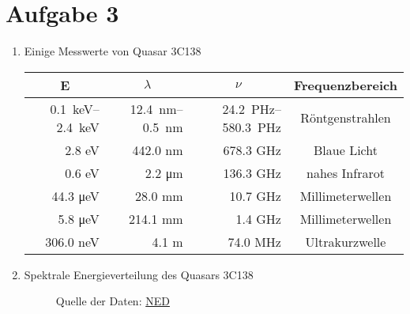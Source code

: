 \documentclass[11pt,a4paper]{scrartcl}
\newcommand{\head}[1]{\multicolumn{1}{c}{#1}}
\begin{document}
\section*{Aufgabe 3}

\begin{enumerate}[label=\textbf{(\alph*)}]

\item
Einige Messwerte von Quasar 3C138

\begin{table}[h!]
\centering
\begin{tabular}{rrrc}
    \toprule
    \head{E} & \head{$\lambda$} & \head{$\nu$} & \head{Frequenzbereich} \\
    \midrule
    \SIrange{0.1}{2.4}{\kilo\electronvolt} & \SIrange{12.4}{0.5}{\nano\metre} &
    \SIrange{24.2}{580.3}{\peta\hertz} & Röntgenstrahlen \\
    2.8 \si{\electronvolt} & 442.0 \si{\nano\metre} & 678.3 \si{\giga\hertz} &
    Blaue Licht \\
    0.6 \si{\electronvolt} & 2.2 \si{\micro\metre} & 136.3 \si{\giga\hertz} &
    nahes Infrarot \\
    44.3 \si{\micro\electronvolt} & 28.0 \si{\milli\metre} & 10.7 \si{\giga\hertz}
    &  Millimeterwellen \\
    5.8 \si{\micro\electronvolt} & 214.1 \si{\milli\metre} & 1.4 \si{\giga\hertz}
    & Millimeterwellen \\
    306.0 \si{\nano\electronvolt} & 4.1 \si{\metre} & 74.0 \si{\mega\hertz} &
    Ultrakurzwelle \\
    \bottomrule
\end{tabular}
\label{tab:tab1}
\end{table}
\vspace*{\baselineskip}

\item
Spektrale Energieverteilung des Quasars 3C138

\begin{figure}[h!]
\centering
\caption{Quelle der Daten: \href{https://ned.ipac.caltech.edu/}{NED}}
\end{figure}


\end{enumerate}
\end{document}
